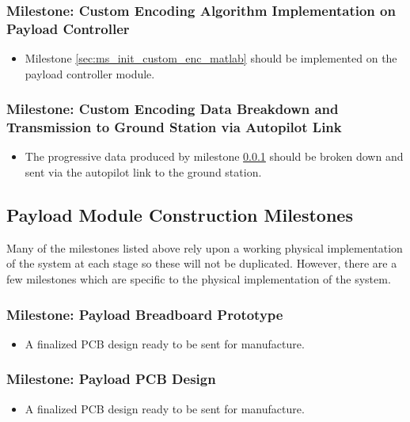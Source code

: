 	\subsubsection{Milestone: Custom Encoding Algorithm Implementation on Payload Controller}
		\label{sec:ms_init_custom_enc_payload}
		\begin{itemize}
			\item 	Milestone \ref{sec:ms_init_custom_enc_matlab} should be implemented on
				the payload controller module.
		\end{itemize}

	\subsubsection{Milestone: Custom Encoding Data Breakdown and Transmission to Ground Station via Autopilot Link}
		\label{sec:ms_init_custom_breakdown_transmission}
		\begin{itemize}
			\item 	The progressive data produced by milestone
				\ref{sec:ms_init_custom_enc_payload} should be broken down and sent
				via the autopilot link to the ground station.
		\end{itemize}

\subsection{Payload Module Construction Milestones}
Many of the milestones listed above rely upon a working physical implementation of the system at each stage
so these will not be duplicated. However, there are a few milestones which are specific to the physical implementation
of the system.



	\subsubsection{Milestone: Payload Breadboard Prototype}
		\begin{itemize}
			\item A finalized PCB design ready to be sent for manufacture.
		\end{itemize}

	\subsubsection{Milestone: Payload PCB Design}
		\begin{itemize}
			\item A finalized PCB design ready to be sent for manufacture. 
		\end{itemize}
		
